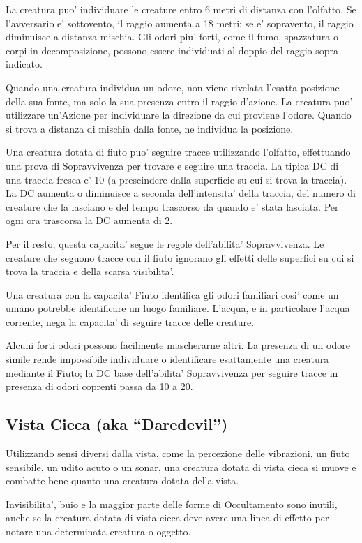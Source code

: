 \documentclass[a4paper,11pt,twoside,openany]{book}
\begin{document}
La creatura puo' individuare le creature entro 6 metri di distanza con l'olfatto. Se l'avversario e' sottovento, il raggio aumenta a 18 metri; se e' sopravento, il raggio diminuisce a distanza mischia.
Gli odori piu' forti, come il fumo, spazzatura o corpi in decomposizione, possono essere individuati al doppio del raggio sopra indicato.

Quando una creatura individua un odore, non viene rivelata l'esatta posizione della sua fonte, ma solo la sua presenza entro il raggio d'azione. La creatura puo' utilizzare un'Azione per individuare la direzione da cui proviene l'odore. Quando si trova a distanza di mischia dalla fonte, ne individua la posizione.

Una creatura dotata di fiuto puo' seguire tracce utilizzando l'olfatto, effettuando una prova di Sopravvivenza per trovare e seguire una traccia. La tipica DC di una traccia fresca e' 10 (a prescindere dalla superficie su cui si trova la traccia). La DC aumenta o diminuisce a seconda dell'intensita' della traccia, del numero di creature che la lasciano e del tempo trascorso da quando e' stata lasciata. Per ogni ora trascorsa la DC aumenta di 2.

Per il resto, questa capacita' segue le regole dell'abilita' Sopravvivenza. Le creature che seguono tracce con il fiuto ignorano gli effetti delle superfici su cui si trova la traccia e della scarsa visibilita'.

Una creatura con la capacita' Fiuto identifica gli odori familiari cosi' come un umano potrebbe identificare un luogo familiare. L'acqua, e in particolare l'acqua corrente, nega la capacita' di seguire tracce delle creature.

Alcuni forti odori possono facilmente mascherarne altri. La presenza di un odore simile rende impossibile individuare o identificare esattamente una creatura mediante il Fiuto; la DC base dell'abilita' Sopravvivenza per seguire tracce in presenza di odori coprenti passa da 10 a 20.


\subsection{Vista Cieca (aka “Daredevil”)}

Utilizzando sensi diversi dalla vista, come la percezione delle vibrazioni, un fiuto sensibile, un udito acuto o un sonar, una creatura dotata di vista cieca si muove e combatte bene quanto una creatura dotata della vista. 

Invisibilita’, buio e la maggior parte delle forme di Occultamento sono inutili, anche se la creatura dotata di vista cieca deve avere una linea di effetto per notare una determinata creatura o oggetto. 
\end{document}
